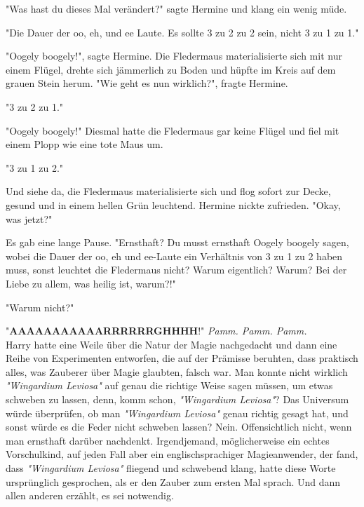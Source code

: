{"Was hast du dieses Mal verändert?" sagte Hermine und klang ein wenig müde.

"Die Dauer der oo, eh, und ee Laute. Es sollte 3 zu 2 zu 2 sein, nicht 3 zu 1 zu 1."

"Oogely boogely!", sagte Hermine. Die Fledermaus materialisierte sich mit nur einem Flügel, drehte sich jämmerlich zu Boden und hüpfte im Kreis auf dem grauen Stein herum. "Wie geht es nun wirklich?", fragte Hermine.

"3 zu 2 zu 1."

"Oogely boogely!" Diesmal hatte die Fledermaus gar keine Flügel und fiel mit einem Plopp wie eine tote Maus um.

"3 zu 1 zu 2."

Und siehe da, die Fledermaus materialisierte sich und flog sofort zur Decke, gesund und in einem hellen Grün leuchtend. Hermine nickte zufrieden. "Okay, was jetzt?"

Es gab eine lange Pause. "Ernsthaft? Du musst ernsthaft Oogely boogely sagen, wobei die Dauer der oo, eh und ee-Laute ein Verhältnis von 3 zu 1 zu 2 haben muss, sonst leuchtet die Fledermaus nicht? Warum eigentlich? Warum? Bei der Liebe zu allem, was heilig ist, warum?!"

"Warum nicht?"

"\textbf{AAAAAAAAAAARRRRRRGHHHH}!" \emph{Pamm. Pamm. Pamm.}\\ Harry hatte eine Weile über die Natur der Magie nachgedacht und dann eine Reihe von Experimenten entworfen, die auf der Prämisse beruhten, dass praktisch alles, was Zauberer über Magie glaubten, falsch war. Man konnte nicht wirklich \emph{"Wingardium Leviosa"} auf genau die richtige Weise sagen müssen, um etwas schweben zu lassen, denn, komm schon, \emph{"Wingardium Leviosa"}? Das Universum würde überprüfen, ob man \emph{"Wingardium Leviosa"} genau richtig gesagt hat, und sonst würde es die Feder nicht schweben lassen? Nein. Offensichtlich nicht, wenn man ernsthaft darüber nachdenkt. Irgendjemand, möglicherweise ein echtes Vorschulkind, auf jeden Fall aber ein englischsprachiger Magieanwender, der fand, dass \emph{"Wingardium Leviosa"} fliegend und schwebend klang, hatte diese Worte ursprünglich gesprochen, als er den Zauber zum ersten Mal sprach. Und dann allen anderen erzählt, es sei notwendig.

}
